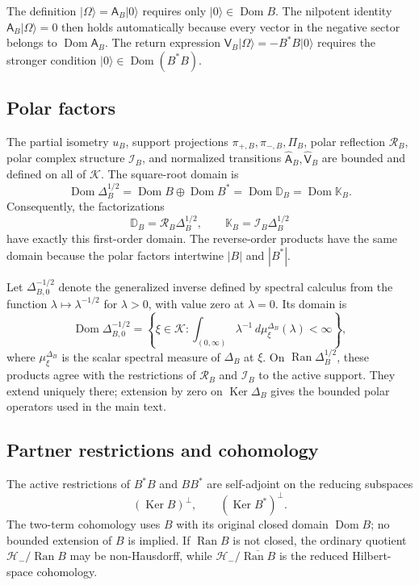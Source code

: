 \documentclass[11pt,reqno]{scrartcl}
\newcommand{\scrK}{\mathscr K}
\newcommand{\scrHm}{\mathscr H_{-}}
\newcommand{\Aop}{\mathsf A}
\newcommand{\Vop}{\mathsf V}
\newcommand{\DB}{\mathbb D}
\newcommand{\KB}{\mathbb K}
\newcommand{\DeltaB}{\Delta}
\newcommand{\ket}[1]{\lvert #1\rangle}
\DeclareMathOperator{\Dom}{Dom}
\DeclareMathOperator{\Ran}{Ran}
\DeclareMathOperator{\Ker}{Ker}
\theoremstyle{plain}
\theoremstyle{definition}
\theoremstyle{remark}
\begin{document}
The definition \(\ket\Omega=\Aop_B\ket0\) requires only
\(\ket0\in\Dom B\). The nilpotent identity
\(\Aop_B\ket\Omega=0\) then holds automatically because every vector in the
negative sector belongs to \(\Dom\Aop_B\). The return expression
\(\Vop_B\ket\Omega=-B^*B\ket0\) requires the stronger condition
\(\ket0\in\Dom(B^*B)\).

\subsection{Polar factors}

The partial isometry \(u_B\), support projections
\(\pi_{+,B},\pi_{-,B},\Pi_B\), polar reflection \(\mathcal R_B\), polar
complex structure \(\mathcal I_B\), and normalized transitions
\(\widehat{\Aop}_B,\widehat{\Vop}_B\) are bounded and defined on all of
\(\scrK\). The square-root domain is
\begin{equation}
  \Dom\DeltaB_B^{1/2}
  =\Dom B\oplus\Dom B^*
  =\Dom\DB_B
  =\Dom\KB_B.
\end{equation}
Consequently, the factorizations
\begin{equation}
  \DB_B=\mathcal R_B\DeltaB_B^{1/2},
  \qquad
  \KB_B=\mathcal I_B\DeltaB_B^{1/2}
\end{equation}
have exactly this first-order domain. The reverse-order products have the
same domain because the polar factors intertwine \(|B|\) and \(|B^*|\).

Let \(\DeltaB_{B,0}^{-1/2}\) denote the generalized inverse defined by
spectral calculus from the function \(\lambda\mapsto\lambda^{-1/2}\) for
\(\lambda>0\), with value zero at \(\lambda=0\). Its domain is
\begin{equation}
  \Dom\DeltaB_{B,0}^{-1/2}
  =\left\{\xi\in\scrK:
  \int_{(0,\infty)}\lambda^{-1}\,d\mu_\xi^{\DeltaB_B}(\lambda)<\infty
  \right\},
\end{equation}
where \(\mu_\xi^{\DeltaB_B}\) is the scalar spectral measure of
\(\DeltaB_B\) at \(\xi\). On \(\Ran\DeltaB_B^{1/2}\), these products agree with the restrictions of
\(\mathcal R_B\) and \(\mathcal I_B\) to the active support.  They extend
uniquely there; extension by zero on \(\Ker\DeltaB_B\) gives the bounded
polar operators used in the main text.

\subsection{Partner restrictions and cohomology}

The active restrictions of \(B^*B\) and \(BB^*\) are self-adjoint on the
reducing subspaces
\begin{equation}
  (\Ker B)^\perp,
  \qquad
  (\Ker B^*)^\perp.
\end{equation}
The two-term cohomology uses \(B\) with its original closed domain
\(\Dom B\); no bounded extension of \(B\) is implied. If \(\Ran B\) is not
closed, the ordinary quotient \(\scrHm/\Ran B\) may be non-Hausdorff, while
\(\scrHm/\overline{\Ran B}\) is the reduced Hilbert-space cohomology.
\end{document}
